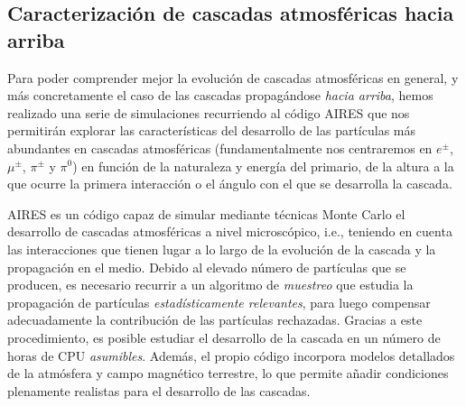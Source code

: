 \documentclass[12 pt, a4paper]{article} %
\numberwithin{equation}{section}
\numberwithin{figure}{section}
\numberwithin{table}{section}
\begin{document}
	\subsection{Caracterización de cascadas atmosféricas hacia arriba}\label{sec22}
	Para poder comprender mejor la evolución de cascadas atmosféricas en general, y más concretamente el caso de las cascadas propagándose \textit{hacia arriba}, hemos realizado una serie de simulaciones recurriendo al código AIRES \cite{https://doi.org/10.13140/rg.2.2.12566.40002} que nos permitirán explorar las características del desarrollo de las partículas más abundantes en cascadas atmosféricas (fundamentalmente nos centraremos en $e^\pm$, $\mu^\pm$, $\pi^\pm$ y $\pi^0$) en función de la naturaleza y energía del primario, de la altura a la que ocurre la primera interacción o el ángulo con el que se desarrolla la cascada. 
	
	AIRES es un código capaz de simular mediante técnicas Monte Carlo el desarrollo de cascadas atmosféricas a nivel microscópico, i.e., teniendo en cuenta las interacciones que tienen lugar a lo largo de la evolución de la cascada y la propagación en el medio. Debido al elevado número de partículas que se producen, es necesario recurrir a un algoritmo de \textit{muestreo} que estudia la propagación de partículas \textit{estadísticamente relevantes}, para luego compensar adecuadamente la contribución de las partículas rechazadas. Gracias a este procedimiento, es posible estudiar el desarrollo de la cascada en un número de horas de CPU \textit{asumibles}. Además, el propio código incorpora modelos detallados de la atmósfera y campo magnético terrestre, lo que permite añadir condiciones plenamente realistas para el desarrollo de las cascadas.
	
\end{document}
